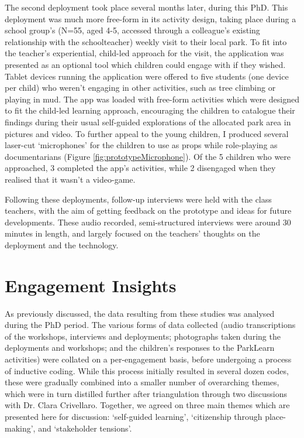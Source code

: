 The second deployment took place several months later, during this PhD. This deployment was much more free-form in its activity design, taking place during a school group’s (N=55, aged 4-5, accessed through a colleague's existing relationship with the schoolteacher) weekly visit to their local park. To fit into the teacher’s experiential, child-led approach for the visit, the application was presented as an optional tool which children could engage with if they wished. Tablet devices running the application were offered to five students (one device per child) who weren't engaging in other activities, such as tree climbing or playing in mud. The app was loaded with free-form activities which were designed to fit the child-led learning approach, encouraging the children to catalogue their findings during their usual self-guided explorations of the allocated park area in pictures and video. To further appeal to the young children, I produced several laser-cut `microphones' for the children to use as props while role-playing as documentarians (Figure \ref{fig:prototypeMicrophone}). Of the 5 children who were approached, 3 completed the app’s activities, while 2 disengaged when they realised that it wasn't a video-game.

Following these deployments, follow-up interviews were held with the class teachers, with the aim of getting feedback on the prototype and ideas for future developments. These audio recorded, semi-structured interviews were around 30 minutes in length, and largely focused on the teachers' thoughts on the deployment and the technology.

\section{Engagement Insights}
\label{sec:InfrastructureInsights}
As previously discussed, the data resulting from these studies was analysed during the PhD period. The various forms of data collected (audio transcriptions of the workshops, interviews and deployments; photographs taken during the deployments and workshops; and the children's responses to the ParkLearn activities) were collated on a per-engagement basis, before undergoing a process of inductive coding. While this process initially resulted in several dozen codes, these were gradually combined into a smaller number of overarching themes, which were in turn distilled further after triangulation through two discussions with Dr. Clara Crivellaro. Together, we agreed on three main themes which are presented here for discussion: `self-guided learning', `citizenship through place-making', and `stakeholder tensions'. 

